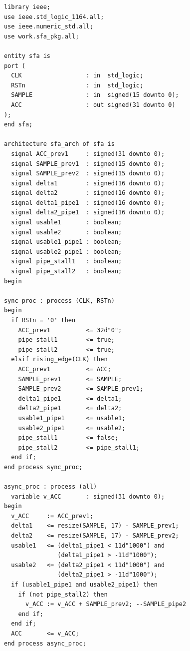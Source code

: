 \begin{table}[t!]
\begin{minipage}[t][23cm][t]{0.51\linewidth}
		\begin{verbatim}
      library ieee;
      use ieee.std_logic_1164.all;
      use ieee.numeric_std.all;
      use work.sfa_pkg.all;
      
      entity sfa is
      port (
        CLK                  : in  std_logic;
        RSTn                 : in  std_logic;
        SAMPLE               : in  signed(15 downto 0);
        ACC                  : out signed(31 downto 0)
      );
      end sfa;
      
      architecture sfa_arch of sfa is
        signal ACC_prev1     : signed(31 downto 0);
        signal SAMPLE_prev1  : signed(15 downto 0);
        signal SAMPLE_prev2  : signed(15 downto 0);
        signal delta1        : signed(16 downto 0);
        signal delta2        : signed(16 downto 0);
        signal delta1_pipe1  : signed(16 downto 0);
        signal delta2_pipe1  : signed(16 downto 0);
        signal usable1       : boolean;
        signal usable2       : boolean;
        signal usable1_pipe1 : boolean;
        signal usable2_pipe1 : boolean;
        signal pipe_stall1   : boolean;
        signal pipe_stall2   : boolean;
      begin
      
      sync_proc : process (CLK, RSTn)
      begin
        if RSTn = '0' then
          ACC_prev1          <= 32d"0";
          pipe_stall1        <= true;     
          pipe_stall2        <= true;
        elsif rising_edge(CLK) then
          ACC_prev1          <= ACC;
          SAMPLE_prev1       <= SAMPLE;  
          SAMPLE_prev2       <= SAMPLE_prev1;
          delta1_pipe1       <= delta1;  
          delta2_pipe1       <= delta2;
          usable1_pipe1      <= usable1; 
          usable2_pipe1      <= usable2;
          pipe_stall1        <= false;     
          pipe_stall2        <= pipe_stall1;
        end if;
      end process sync_proc;
      
      async_proc : process (all)
        variable v_ACC       : signed(31 downto 0);
      begin
        v_ACC     := ACC_prev1;
        delta1    <= resize(SAMPLE, 17) - SAMPLE_prev1;
        delta2    <= resize(SAMPLE, 17) - SAMPLE_prev2;
        usable1   <= (delta1_pipe1 < 11d"1000") and 
                     (delta1_pipe1 > -11d"1000");
        usable2   <= (delta2_pipe1 < 11d"1000") and 
                     (delta2_pipe1 > -11d"1000");
        if (usable1_pipe1 and usable2_pipe1) then
          if (not pipe_stall2) then
            v_ACC := v_ACC + SAMPLE_prev2; --SAMPLE_pipe2
          end if;
        end if;
        ACC       <= v_ACC;
      end process async_proc;
      

\end{verbatim}
\end{minipage}
\end{table}
